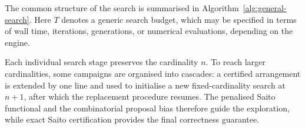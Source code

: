 \documentclass[pdflatex,sn-mathphys-num]{sn-jnl}%
\theoremstyle{remark}
\theoremstyle{definition}
\begin{document}
The common structure of the search is summarised in Algorithm~\ref{alg:general-search}. Here $T$ denotes a generic search budget, which may be specified in terms of wall time, iterations, generations, or numerical evaluations, depending on the engine.


Each individual search stage preserves the cardinality $n$. To reach larger cardinalities, some campaigns are organised into cascades: a certified arrangement is extended by one line and used to initialise a new fixed-cardinality search at $n+1$, after which the replacement procedure resumes. The penalised Saito functional and the combinatorial proposal bias therefore guide the exploration, while exact Saito certification provides the final correctness guarantee.


\end{document}
